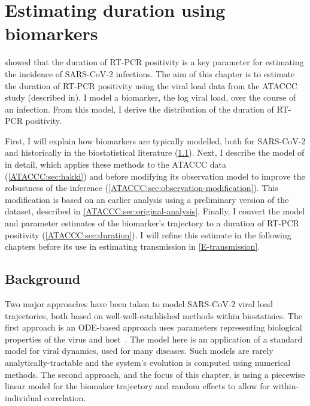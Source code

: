 \documentclass[thesis.tex]{subfiles}
\begin{document}
\ifSubfilesClassLoaded{
  \setcounter{chapter}{3}
}

\chapter{Estimating duration using biomarkers} \label{ATACCC}


 showed that the duration of RT-PCR positivity is a key parameter for estimating the incidence of SARS-CoV-2 infections.
The aim of this chapter is to estimate the duration of RT-PCR positivity using the viral load data from the ATACCC study (described in).
I model a biomarker, the log viral load, over the course of an infection.
From this model, I derive the distribution of the duration of RT-PCR positivity.

First, I will explain how biomarkers are typically modelled, both for SARS-CoV-2 and historically in the biostatistical literature (\cref{ATACCC:sec:background}).
Next, I describe the model of \textcite{hakkiOnset} in detail, which applies these methods to the ATACCC data (\cref{ATACCC:sec:hakki}) and before modifying its observation model to improve the robustness of the inference (\cref{ATACCC:sec:observation-modification}).
This modification is based on an earlier analysis using a preliminary version of the dataset, described in \cref{ATACCC:sec:original-analysis}.
Finally, I convert the model and parameter estimates of the biomarker's trajectory to a duration of RT-PCR positivity (\cref{ATACCC:sec:duration}).
I will refine this estimate in the following chapters before its use in estimating transmission in \cref{E-transmission}.

\section{Background} \label{ATACCC:sec:background}

Two major approaches have been taken to model SARS-CoV-2 viral load trajectories, both based on well-well-established methods within biostatisics.
The first approach is an ODE-based approach uses parameters representing biological properties of the virus and host~\autocite[e.g.:][]{ejimaEstimation,keVivo,kimQuantitative,goncalvesTiming,perelsonMechanistic}.
The model here is an application of a standard model for viral dynamics, used for many diseases.
Such models are rarely analytically-tractable and the system's evolution is computed using numerical methods.
The second approach, and the focus of this chapter, is using a piecewise linear model for the biomaker trajectory and random effects to allow for within-individual correlation.
\end{document}
